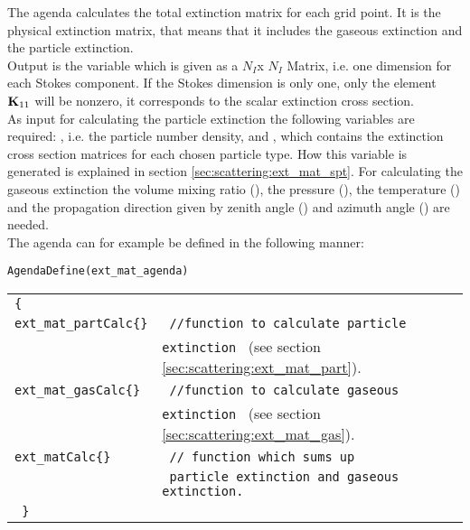\label{sec:scattering:ext_mat_agenda}

The agenda  calculates the total extinction
matrix \ExtMat{}
for each grid point. It is the physical extinction matrix, that means
that it includes the gaseous extinction and the particle
extinction.\\
Output is the variable  which is given
as a $N_I$x $N_I$ Matrix, i.e. one dimension for each Stokes component. If the
Stokes dimension is only one, only the element ${\bf K}_{11}$ will be
nonzero, it corresponds to the scalar extinction cross section. \\
As input for calculating the particle extinction the following
variables are required:
, i.e. the particle number density, and 
, which contains the extinction cross section
matrices for each chosen particle type. How this variable is generated
is explained in section \ref{sec:scattering:ext_mat_spt}. For calculating the
gaseous extinction the volume mixing ratio (), the
pressure  (), the temperature  () and the
propagation direction given by zenith angle () and
azimuth angle () are needed.\\
The agenda can for example be defined in the following manner:

\verb|AgendaDefine(ext_mat_agenda)|\\
\begin{tabular}[h]{l l}
\verb|{ |\\
\verb|ext_mat_partCalc{}| & \verb| //function to calculate particle |\\
& \verb|extinction | (see section \ref{sec:scattering:ext_mat_part}).\\
\verb|ext_mat_gasCalc{}| & \verb| //function to calculate gaseous | \\
& \verb|extinction | (see section \ref{sec:scattering:ext_mat_gas}).\\ 
\verb|ext_matCalc{}| &\verb| // function which sums up | \\
& \verb| particle extinction and gaseous extinction.|\\
\verb| }|
\end{tabular}

\label{sec:scattering:ext_mat_part}

